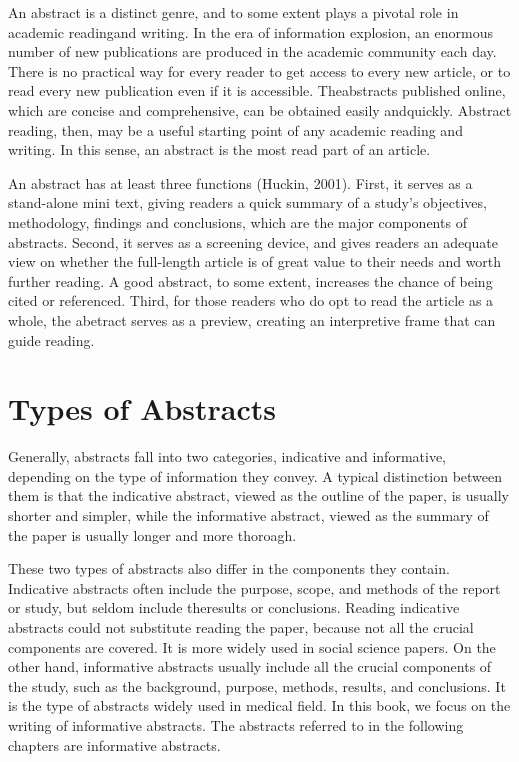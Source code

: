 \documentclass{ctexbook}
\begin{document}
An abstract is a distinct genre, and to some extent plays a pivotal role in academic readingand writing. In the era of information explosion, an enormous number of new publications are produced in the academic community each day. There is no practical way for every reader to get access to every new article, or to read every new publication even if it is accessible. Theabstracts published online, which are concise and comprehensive, can be obtained easily andquickly. Abstract reading, then, may be a useful starting point of any academic reading and writing. In this sense, an abstract is the most read part of an article.

An abstract has at least three functions (Huckin, 2001). First, it serves as a stand-alone mini text, giving readers a quick summary of a study's objectives, methodology, findings and conclusions, which are the major components of abstracts. Second, it serves as a screening device, and gives readers an adequate view on whether the full-length article is of great value to their needs and worth further reading. A good abstract, to some extent, increases the chance of being cited or referenced. Third, for those readers who do opt to read the article as a whole, the abetract serves as a preview, creating an interpretive frame that can guide reading.

\section{Types of Abstracts}

Generally, abstracts fall into two categories, indicative and informative, depending on the type of information they convey. A typical distinction between them is that the indicative abstract, viewed as the outline of the paper, is usually shorter and simpler, while the informative abstract, viewed as the summary of the paper is usually longer and more thoroagh. 

These two types of abstracts also differ in the components they contain. Indicative abstracts often include the purpose, scope, and methods of the report or study, but seldom include theresults or conclusions. Reading indicative abstracts could not substitute reading the paper, because not all the crucial components are covered. It is more widely used in social science papers. On the other hand, informative abstracts usually include all the crucial components of the study, such as the background, purpose, methods, results, and conclusions. It is the type of abstracts widely used in medical field. In this book, we focus on the writing of informative abstracts. The abstracts referred to in the following chapters are informative abstracts.
\end{document}
